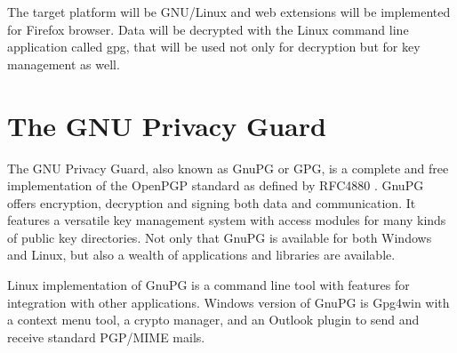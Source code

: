 The target platform will be GNU/Linux and web extensions will be implemented for Firefox browser. Data will be decrypted with the Linux command line application called gpg, that will be used not only for decryption but for key management as well.


\chapter{The GNU Privacy Guard}
The GNU Privacy Guard, also known as GnuPG or GPG, is a complete and free implementation of the OpenPGP standard as defined by RFC4880 \cite{RFC4880}. GnuPG offers encryption, decryption and signing both data and communication. It features a versatile key management system with access modules for many kinds of public key directories. Not only that GnuPG is available for both Windows and Linux, but also a wealth of applications and libraries are available. \cite{GnuPG}

Linux implementation of GnuPG is a command line tool with features for integration with other applications. Windows version of GnuPG is Gpg4win with a context menu tool, a crypto manager, and an Outlook plugin to send and receive standard PGP/MIME mails. \cite{GnuPG}

